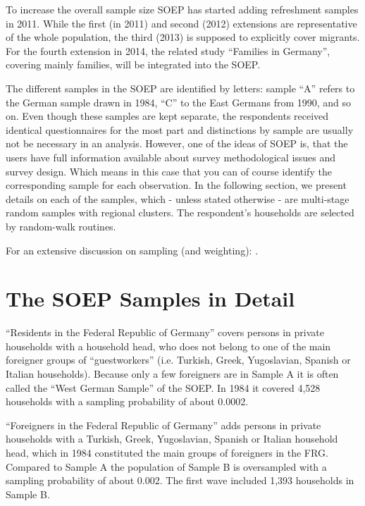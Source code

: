 \documentclass[letterpaper,10pt,openany,onesideH,english]{sphinxmanual}
\begin{document}
To increase the overall sample size SOEP has started adding refreshment samples in 2011. While the first (in 2011) and second (2012) extensions are representative of the whole population, the third (2013) is supposed to explicitly cover migrants. For the fourth extension in 2014, the related study “Families in Germany”, covering mainly families, will be integrated into the SOEP.

The different samples in the SOEP are identified by letters: sample “A” refers to the German sample drawn in 1984, “C” to the East Germans from 1990, and so on. Even though these samples are kept separate, the respondents received identical questionnaires for the most part and distinctions by sample are usually not be necessary in an analysis.
However, one of the ideas of SOEP is, that the users have full information available about survey methodological issues and survey design. Which means in this case that you can of course identify the corresponding sample for each observation. In the following section, we present details on each of the samples, which - unless stated otherwise - are multi-stage random samples with regional clusters. The respondent’s households are selected by random-walk routines.

For an extensive discussion on sampling (and weighting): .


\section{The SOEP Samples in Detail}
\label{\detokenize{Target Population and Samples/index:the-soep-samples-in-detail}}
 “Residents in the Federal Republic of Germany” covers persons in private households with a household head, who does not belong to one of the main foreigner groups of “guestworkers” (i.e. Turkish, Greek, Yugoslavian, Spanish or Italian households). Because only a few foreigners are in Sample A it is often called the “West German Sample” of the SOEP. In 1984 it covered 4,528 households with a sampling probability of about 0.0002.

 “Foreigners in the Federal Republic of Germany” adds persons in private households with a Turkish, Greek, Yugoslavian, Spanish or Italian household head, which in 1984 constituted the main groups of foreigners in the FRG. Compared to Sample A the population of Sample B is oversampled with a sampling probability of about 0.002. The first wave included 1,393 households in Sample B.
\end{document}
